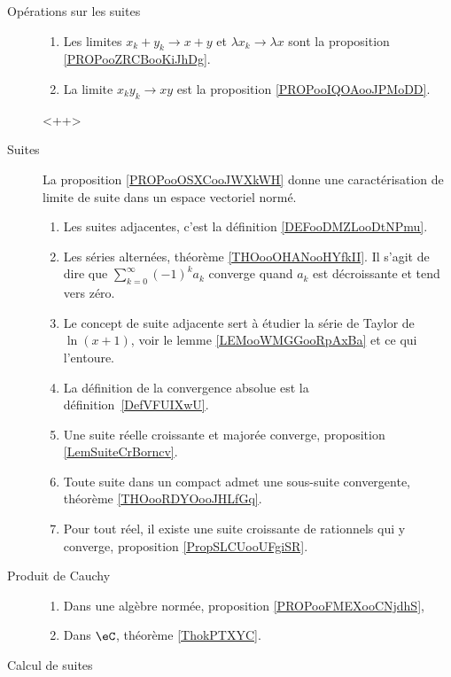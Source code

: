 
\begin{description}
	\item[Opérations sur les suites]
		\begin{enumerate}
			\item
			      Les limites \( x_k+y_k\to x+y\) et \( \lambda x_k\to \lambda x\) sont la proposition \ref{PROPooZRCBooKiJhDg}.
			\item
			      La limite \( x_ky_k\to xy\) est la proposition \ref{PROPooIQOAooJPMoDD}.
		\end{enumerate}<++>
	\item[Suites]
		La proposition \ref{PROPooOSXCooJWXkWH} donne une caractérisation de limite de suite dans un espace vectoriel normé.
		\begin{enumerate}
			\item
			      Les suites adjacentes, c'est la définition \ref{DEFooDMZLooDtNPmu}.
			\item
			      Les séries alternées, théorème \ref{THOooOHANooHYfkII}. Il s'agit de dire que \( \sum_{k=0}^{\infty}(-1)^ka_k\) converge quand \( a_k\) est décroissante et tend vers zéro.
			\item
			      Le concept de suite adjacente sert à étudier la série de Taylor de \( \ln(x+1)\), voir le lemme \ref{LEMooWMGGooRpAxBa} et ce qui l'entoure.
			\item
			      La définition de la convergence absolue est la définition~\ref{DefVFUIXwU}.
			\item
			      Une suite réelle croissante et majorée converge, proposition \ref{LemSuiteCrBorncv}.
			\item
			      Toute suite dans un compact admet une sous-suite convergente, théorème \ref{THOooRDYOooJHLfGq}.
			\item
			      Pour tout réel, il existe une suite croissante de rationnels qui y converge, proposition \ref{PropSLCUooUFgiSR}.
		\end{enumerate}
	\item[Produit de Cauchy]
		\begin{enumerate}
			\item
			      Dans une algèbre normée, proposition \ref{PROPooFMEXooCNjdhS},
			\item
			      Dans \( \eC\), théorème \ref{ThokPTXYC}.
		\end{enumerate}
	\item[Calcul de suites]
		\begin{enumerate}

\end{enumerate}
\end{description}
